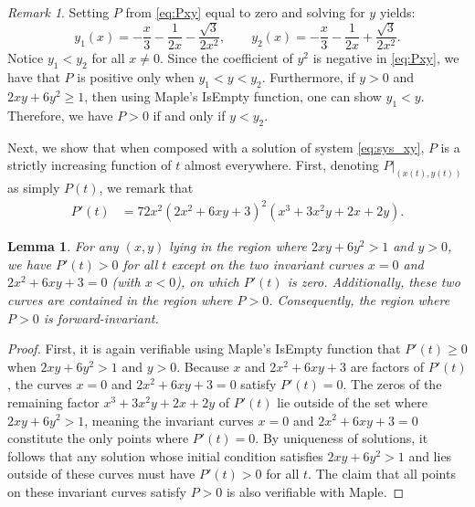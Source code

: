 \documentclass{amsart}
\numberwithin{equation}{section}
\newtheorem{lemma}[equation]{Lemma}
\theoremstyle{plain}
\theoremstyle{definition}
\theoremstyle{remark}
\newtheorem{remark}[equation]{Remark}
\numberwithin{table}{section}
\begin{document}
    \begin{remark}\label{rmk 1}
        Setting $P$ from \eqref{eq:Pxy} equal to zero and solving for $y$ yields:
        \[
        y_1(x) = -\frac{x}{3} - \frac{1}{2x} - \frac{\sqrt{3}}{2x^2},
        \qquad
        y_2(x) = -\frac{x}{3} - \frac{1}{2x} + \frac{\sqrt{3}}{2x^2}.
        \]
        Notice $y_1<y_2$ for all $x\neq0$.
        Since the coefficient of $y^2$ is negative in \eqref{eq:Pxy}, we have that $P$ is positive only when $y_1<y<y_2$. 
        Furthermore, if $y>0$ and $2xy+6y^2\geq 1$, then using Maple's IsEmpty function, one can show $y_1 < y$.
        Therefore, we have $P>0$ if and only if $y<y_2$.
    \end{remark}

    Next, we show that when composed with a solution of system \eqref{eq:sys_xy}, $P$ is a strictly increasing function of $t$ almost everywhere.
    First, denoting $P|_{(x(t),y(t))}$ as simply $P(t)$, we remark that
    \begin{align*}
        P'(t) &= 72x^2\left(2x^2 + 6xy + 3\right)^2 \left(x^3 + 3x^2y + 2x + 2y \right).
    \end{align*}
    
    \begin{lemma}
        \label{lem:Pinc}
        For any $(x,y)$ lying in the region where $2xy+6y^2>1$ and $y>0$, we have $P'(t)>0$ for all $t$ except on the two invariant curves $x=0$ and $2x^2+6xy+3=0$ (with $x<0$), on which $P'(t)$ is zero. 
        Additionally, these two curves are contained in the region where $P>0$.
        Consequently, the region where $P>0$ is forward-invariant.
    \end{lemma}
    
    \begin{proof}
        First, it is again verifiable using Maple's IsEmpty function that $P'(t)\geq 0$ when $2xy+6y^2 > 1$ and $y>0$. 
        Because $x$ and $2x^2+6xy+3$ are factors of $P'(t)$, the curves $x=0$ and $2x^2+6xy+3=0$ satisfy $P'(t)=0$.
        The zeros of the remaining factor $x^3 + 3x^2y + 2x + 2y$ of $P'(t)$ lie outside of the set where $2xy+6y^2 > 1$, meaning the invariant curves $x=0$ and $2x^2+6xy+3=0$ constitute the only points where $P'(t)=0$.
        By uniqueness of solutions, it follows that any solution whose initial condition satisfies $2xy+6y^2 > 1$ and lies outside of these curves must have $P'(t)>0$ for all $t$. 
        The claim that all points on these invariant curves satisfy $P>0$ is also verifiable with Maple.
    \end{proof}  
    
\end{document}
